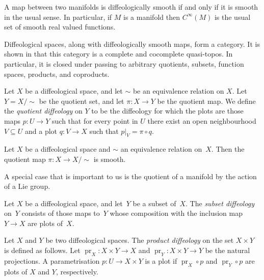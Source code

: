 \documentclass[pdftex]{sigma}
\numberwithin{equation}{section}
\newcommand{\CIN}{{C^\infty}} %
\begin{document}
\begin{Remark}
A map between two manifolds is dif\/feologically smooth
if and only if it is smooth in the usual sense.
In particular, if $M$ is a manifold then $\CIN(M)$ is the usual set
of smooth real valued functions.
\end{Remark}

\begin{Remark}
Dif\/feological spaces, along with dif\/feologically smooth maps,
form a category. It is shown in \cite[Theorem~3.2]{BH} that this category
is a complete and cocomplete quasi-topos.
In particular, it is closed under passing to arbitrary quotients,
subsets, function spaces, products, and coproducts.
\end{Remark}

\begin{Definition}
Let $X$ be a dif\/feological space,
and let $\sim$ be an equivalence relation on $X$.
Let $Y = X/\!\!\sim$ be the quotient set,
and let $\pi \colon X\to Y$ be the quotient map.
We def\/ine the \emph{quotient diffeology} on $Y$
to be the dif\/feology for which the plots are those maps $p \colon U\to Y$
such that for every point in $U$
there exist an open neighbourhood $V \subseteq U$
and a plot $q \colon V\to X$ such that $p|_V = \pi \circ q$.
\end{Definition}

\begin{Remark}
Let $X$ be a dif\/feological space and $\sim$ an equivalence relation on~$X$.
Then the quotient map $\pi \colon X \to X / \!\!\sim$ is smooth.
\end{Remark}

A special case that is important to us is the quotient
of a manifold by the action of a Lie group.

\begin{Definition}
Let $X$ be a dif\/feological space, and let~$Y$ be a subset
of~$X$. The \emph{subset diffeology} on~$Y$ consists
of those maps to~$Y$ whose composition with the inclusion map $Y \to X$
are plots of~$X$.
\end{Definition}

\begin{Definition}
Let $X$ and $Y$ be two dif\/feological spaces.
The \emph{product diffeology} on the set $X \times Y$ is def\/ined as follows.
Let $\operatorname{pr}_X \colon X \times Y \to X$
and $\operatorname{pr}_Y \colon X \times Y \to Y$ be the natural projections.
A parametrisation $p \colon U \to X \times Y$ is a plot
if $\operatorname{pr}_X \circ p$ and $\operatorname{pr}_Y \circ p$
are plots of $X$ and $Y$, respectively.
\end{Definition}
\end{document}
